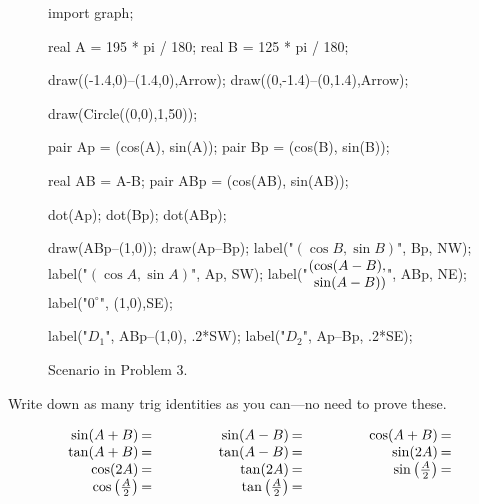 \documentclass[../key.tex]{subfiles}
\begin{document}
\begin{figure}[h]
	\begin{center}
		\begin{minipage}{\textwidth}
			\centering
			\begin{asy}[width=0.5\textwidth]
				import graph;
				
				real A = 195 * pi / 180;
				real B = 125 * pi / 180;
				
				draw((-1.4,0)--(1.4,0),Arrow);
				draw((0,-1.4)--(0,1.4),Arrow);
				
				draw(Circle((0,0),1,50));
				
				pair Ap = (cos(A), sin(A));
				pair Bp = (cos(B), sin(B));
				
				real AB = A-B;
				pair ABp = (cos(AB), sin(AB));
				
				dot(Ap);
				dot(Bp);
				dot(ABp);
				
				draw(ABp--(1,0));
				draw(Ap--Bp);
				label("$(\cos B, \sin B)$", Bp, NW);
				label("$(\cos A, \sin A)$", Ap, SW);
				label("$\arraycolsep=0pt \begin{array}{rl} (& \cos (A-B), \\ & \sin (A-B)) \end{array}$", ABp, NE);
				label("$0^\circ$", (1,0),SE);
				
				label("$D_1$", ABp--(1,0), .2*SW);
				label("$D_2$", Ap--Bp, .2*SE);
			
			\end{asy}
		\end{minipage}
	\end{center}
	
	\begin{center}
		\begin{minipage}{\textwidth}
			\caption{Scenario in Problem 3.}
			\label{fig:unit_circle}
		\end{minipage}
	\end{center}
	\vspace*{-2\baselineskip}
\end{figure}

\begin{outer_problem}
\item Write down as many trig identities as you can---no need to prove these.

\renewcommand{\arraystretch}{1.1}
$$\arraycolsep=1pt\begin{array}{rlrlrl}
\sin(A+B)&=\qquad\qquad\phantom{.}&\sin(A-B) &=\qquad\qquad\phantom{.}&\cos(A+B) &= \\
\tan(A+B)&= &\tan(A-B) &= &\sin(2A) &= \\
\cos(2A)&= &\tan(2A) &= &\sin\left(\frac{A}{2}\right) &= \\
\cos\left(\frac{A}{2}\right)&= &\tan\left(\frac{A}{2}\right) &= & & \\
\end{array}$$
\end{outer_problem}
\end{document}
